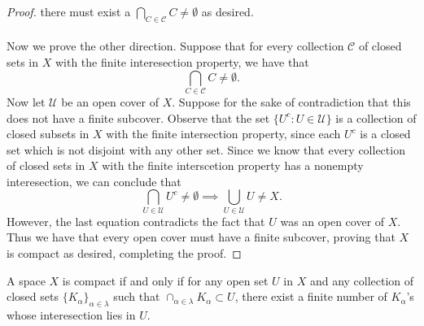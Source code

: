 \documentclass[a4paper,12pt,twoside]{hmcpset}
\begin{document}
\begin{proof}
    there must exist a $\bigcap_{C \in \mathcal{C}} C \ne \emptyset$
    as desired. \\
    \\
    Now we prove the other direction. Suppose that for every
    collection $\mathcal{C}$ of closed sets in $X$ with the finite
    interesection property, we have that 
    $$
    \bigcap_{C \in \mathcal{C}} C \ne \emptyset.
    $$
    Now let $\mathcal{U}$ be an open cover of $X$. Suppose for the
    sake of contradiction that this does not have a finite subcover.
    Observe that the set $\{U^c : U \in \mathcal{U}\}$ is a collection
    of closed subsets in $X$ with the finite intersection property,
    since each $U^c$ is a closed set which is not disjoint with any
    other set. Since we know that every collection of closed sets in
    $X$ with the finite interscetion property has a nonempty
    interesection, we can conclude that
    $$
    \bigcap_{U \in \mathcal{U}} U^c \ne \emptyset 
    \implies \bigcup_{U \in \mathcal{U}} U \ne X.
    $$ 
    However, the last equation contradicts the fact that $U$ was an
    open cover of $X$. Thus we have that every open cover must have a
    finite subcover, proving that $X$ is compact as desired,
    completing the proof.
\end{proof}


\begin{problem}[Theorem 7.6] A space $X$ is compact if and only if for
    any open set $U$ in $X$ and any collection of closed sets
    $\{K_\alpha\}_{\alpha \in \lambda}$ such that $\cap_{\alpha \in
    \lambda} K_\alpha \subset U$, there exist a finite number of
    $K_\alpha$'s whose interesection lies in $U$.
\end{problem}
\end{document}
